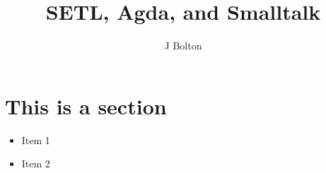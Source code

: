 \documentclass{beamer}
\author{J Bolton}
\title{SETL, Agda, and Smalltalk}
\begin{document}
\maketitle

\section{This is a section}

\begin{itemize}
\item Item 1
\item Item 2
\end{itemize}
\end{document}
